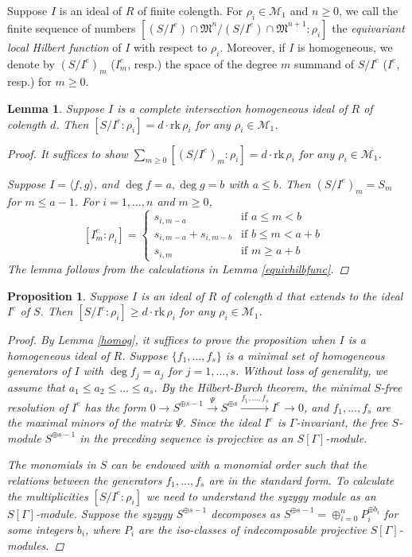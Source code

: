 \documentclass{amsart}[12pt]
\newtheorem{lemma}[theorem]{Lemma}
\newtheorem{prop}[theorem]{Proposition}
\theoremstyle{definition}
\theoremstyle{remark}
\numberwithin{equation}{section}
\begin{document}
Suppose $I$ is an ideal of $R$ of finite colength. For $\rho_i \in \mathcal{M}_1$ and $n \geq 0$, we call the finite sequence of numbers $[(S/I^e) \cap \mathfrak{M}^n/(S/I^e) \cap \mathfrak{M}^{n + 1} : \rho_i]$ the \textit{equivariant local Hilbert function} of $I$ with respect to $\rho_i$. Moreover, if $I$ is homogeneous, we denote by $(S/I^e)_m$ ($I^e_m$, resp.) the space of the degree $m$ summand of $S/I^e$ ($I^e$, resp.) for $m \geq 0$.

\begin{lemma}
Suppose $I$ is a complete intersection homogeneous ideal of $R$ of colength $d$. Then $[S/I^e : \rho_i] = d \cdot \mathrm{rk}\, \rho_i$ for any $\rho_i \in \mathcal{M}_1$.
\begin{proof}
It suffices to show $\sum_{m \geq 0}[(S/I^e)_m : \rho_i] = d \cdot \mathrm{rk}\, \rho_i$ for any $\rho_i \in \mathcal{M}_1$. 

Suppose $I = \langle f, g \rangle$, and $\deg f = a, \deg g = b$ with $a \leq b$. Then $(S/I^e)_m = S_m$ for $m \leq a - 1$. For $i = 1, \dots, n$ and $m \geq 0$, 
\[
[I^e_m : \rho_i] = \begin{cases} 
s_{i, m - a} & \textrm{if $a \leq m < b$} \\
s_{i, m - a} + s_{i, m - b} & \textrm{if $b \leq m < a + b$ } \\
s_{i, m} & \textrm{if $m \geq a + b$}
\end{cases}
\]
The lemma follows from the calculations in Lemma \ref{equivhilbfunc}.
\end{proof}
\end{lemma}

\begin{prop}\label{multiplicity}
Suppose $I$ is an ideal of $R$ of colength $d$ that extends to the ideal $I^e$ of $S$. Then $[S/I^e: \rho_i] \geq d \cdot \mathrm{rk}\, \rho_i$ for any $\rho_i \in \mathcal{M}_1$.
\begin{proof}
By Lemma \ref{homog}, it suffices to prove the proposition when $I$ is a homogeneous ideal of $R$. Suppose $\{f_1, \dots, f_s\}$ is a minimal set of homogeneous generators of $I$ with $\deg f_j = a_j$ for $j = 1, \dots, s$. Without loss of generality, we assume that $a_1 \leq a_2 \leq \dots \leq a_s$. By the Hilbert-Burch theorem, the minimal $S$-free resolution of $I^e$ has the form $0 \to S^{\oplus s - 1} \xrightarrow{\Psi} S^{\oplus s} \xrightarrow{f_1, \dots, f_s} I^e \to 0$, and $f_1, \dots, f_s$ are the maximal minors of the matrix $\Psi$. Since the ideal $I^e$ is $\Gamma$-invariant, the free $S$-module $S^{\oplus s - 1}$ in the preceding sequence is projective as an $S[\Gamma]$-module. 

The monomials in $S$ can be endowed with a monomial order such that the relations between the generators $f_1, \dots, f_s$ are in the standard form. To calculate the multiplicities $[S/I^e: \rho_i]$ we need to understand the syzygy module as an $S[\Gamma]$-module. Suppose the syzygy $S^{\oplus s - 1}$ decomposes as $S^{\oplus s - 1} = \oplus_{i = 0}^n P_i^{\oplus b_i}$ for some integers $b_i$, where $P_i$ are the iso-classes of indecomposable projective $S[\Gamma]$-modules. 

\end{proof}
\end{prop}
\end{document}
